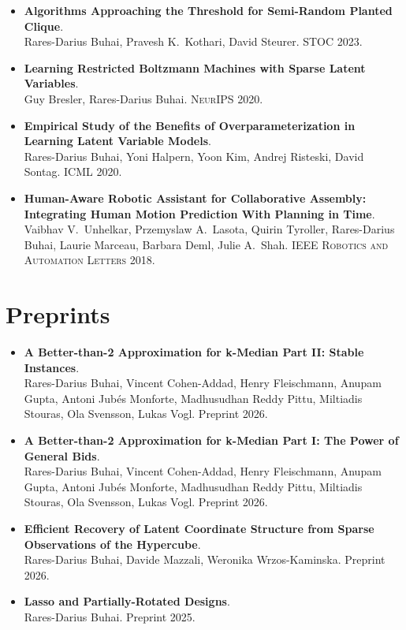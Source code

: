\documentclass[11pt,a4paper]{article}
\begin{document}
\begin{itemize}
  \item {}\textbf{Algorithms Approaching the Threshold for Semi-Random Planted Clique}.\\
  Rares-Darius Buhai, Pravesh K.\ Kothari, David Steurer. \textsc{STOC} 2023.
  \item {}\textbf{Learning Restricted Boltzmann Machines with Sparse Latent Variables}.\\
  Guy Bresler, Rares-Darius Buhai. \textsc{NeurIPS} 2020.
  \item {}\textbf{Empirical Study of the Benefits of Overparameterization in Learning Latent Variable Models}.\\
  Rares-Darius Buhai, Yoni Halpern, Yoon Kim, Andrej Risteski, David Sontag. \textsc{ICML} 2020.
  \item {}\textbf{Human-Aware Robotic Assistant for Collaborative Assembly: Integrating Human Motion Prediction With Planning in Time}.\\
  Vaibhav V.\ Unhelkar, Przemyslaw A.\ Lasota, Quirin Tyroller, Rares-Darius Buhai, Laurie Marceau, Barbara Deml, Julie A.\ Shah. \textsc{IEEE Robotics and Automation Letters} 2018.
\end{itemize}

\section*{Preprints}
\begin{itemize}
  \item {}\textbf{A Better-than-2 Approximation for k-Median Part II: Stable Instances}.\\
  Rares-Darius Buhai, Vincent Cohen-Addad, Henry Fleischmann, Anupam Gupta, Antoni Jub\'{e}s Monforte, Madhusudhan Reddy Pittu, Miltiadis Stouras, Ola Svensson, Lukas Vogl. Preprint 2026.
  \item {}\textbf{A Better-than-2 Approximation for k-Median Part I: The Power of General Bids}.\\
  Rares-Darius Buhai, Vincent Cohen-Addad, Henry Fleischmann, Anupam Gupta, Antoni Jub\'{e}s Monforte, Madhusudhan Reddy Pittu, Miltiadis Stouras, Ola Svensson, Lukas Vogl. Preprint 2026.
  \item {}\textbf{Efficient Recovery of Latent Coordinate Structure from Sparse Observations of the Hypercube}.\\
  Rares-Darius Buhai, Davide Mazzali, Weronika Wrzos-Kaminska. Preprint 2026.
  \item {}\textbf{Lasso and Partially-Rotated Designs}.\\
  Rares-Darius Buhai. Preprint 2025.
\end{itemize}
\end{document}
